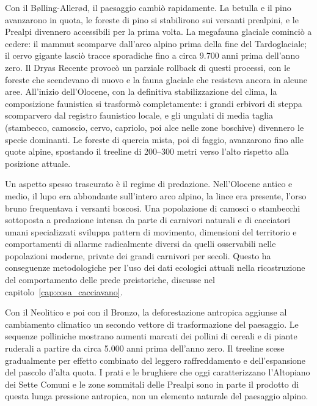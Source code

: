 Con il Bølling-Allerød, il paesaggio cambiò rapidamente. La betulla e il pino avanzarono in quota, le foreste di pino si stabilirono sui versanti prealpini, e le Prealpi divennero accessibili per la prima volta. La megafauna glaciale cominciò a cedere: il mammut scomparve dall'arco alpino prima della fine del Tardoglaciale; il cervo gigante lasciò tracce sporadiche fino a circa 9.700 anni prima dell'anno zero. Il Dryas Recente provocò un parziale rollback di questi processi, con le foreste che scendevano di nuovo e la fauna glaciale che resisteva ancora in alcune aree. All'inizio dell'Olocene, con la definitiva stabilizzazione del clima, la composizione faunistica si trasformò completamente: i grandi erbivori di steppa scomparvero dal registro faunistico locale, e gli ungulati di media taglia (stambecco, camoscio, cervo, capriolo, poi alce nelle zone boschive) divennero le specie dominanti. Le foreste di quercia mista, poi di faggio, avanzarono fino alle quote alpine, spostando il treeline di 200--300 metri verso l'alto rispetto alla posizione attuale.

Un aspetto spesso trascurato è il regime di predazione. Nell'Olocene antico e medio, il lupo era abbondante sull'intero arco alpino, la lince era presente, l'orso bruno frequentava i versanti boscosi. Una popolazione di camosci o stambecchi sottoposta a predazione intensa da parte di carnivori naturali e di cacciatori umani specializzati sviluppa pattern di movimento, dimensioni del territorio e comportamenti di allarme radicalmente diversi da quelli osservabili nelle popolazioni moderne, private dei grandi carnivori per secoli. Questo ha conseguenze metodologiche per l'uso dei dati ecologici attuali nella ricostruzione del comportamento delle prede preistoriche, discusse nel capitolo~\ref{cap:cosa_cacciavano}.

Con il Neolitico e poi con il Bronzo, la deforestazione antropica aggiunse al cambiamento climatico un secondo vettore di trasformazione del paesaggio. Le sequenze polliniche mostrano aumenti marcati dei pollini di cereali e di piante ruderali a partire da circa 5.000 anni prima dell'anno zero. Il treeline scese gradualmente per effetto combinato del leggero raffreddamento e dell'espansione del pascolo d'alta quota. I prati e le brughiere che oggi caratterizzano l'Altopiano dei Sette Comuni e le zone sommitali delle Prealpi sono in parte il prodotto di questa lunga pressione antropica, non un elemento naturale del paesaggio alpino.

